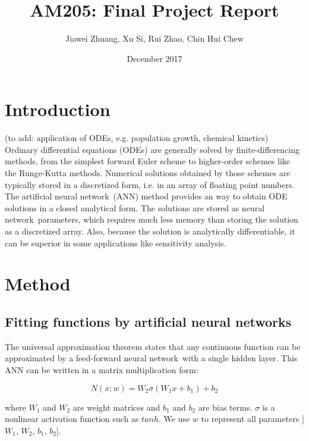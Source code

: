 \documentclass[11pt]{article}
\title{AM205: Final Project Report}
\author{Jiawei Zhuang, Xu Si, Rui Zhao, Chin Hui Chew}
\date{December 2017}
\newcommand{\nn}{neural network}
\newcommand{\ann}{artificial neural network}
\begin{document}
\maketitle

\section{Introduction}

(to add: application of ODEs, e.g. population growth, chemical kinetics) \\

Ordinary differential equations (ODEs) are generally solved by finite-differencing methods, from the simplest forward Euler scheme to higher-order schemes like the Runge-Kutta methods. Numerical solutions obtained by those schemes are typically stored in a discretized form, i.e. in an array of floating point numbers. \\

The \ann\ (ANN) method \cite{Lagaris98} provides an way to obtain ODE solutions in a closed analytical form. The solutions are stored as \nn\ parameters, which requires much less memory than storing the solution as a discretized array. Also, because the solution is analytically differentiable, it can be superior in some applications like sensitivity analysis.

\section{Method}

\subsection{Fitting functions by artificial neural networks}

The universal approximation theorem \cite{Hornik89} states that any continuous function can be approximated by a feed-forward \nn\ with a single hidden layer. This ANN can be written in a matrix multiplication form:

\begin{equation}
N(x; w) = W_2 \sigma(W_1 x + b_1) + b_2
\end{equation}

where $W_1$ and $W_2$ are weight matrices and $b_1$ and $b_2$ are bias terms. $\sigma$ is a nonlinear activation function such as $tanh$. We use $w$ to represent all parameters [$W_1$, $W_2$, $b_1$, $b_2$]. 
\\
\end{document}
